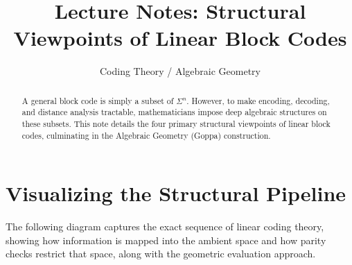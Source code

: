 \documentclass[11pt, a4paper]{article}
\title{\textbf{Lecture Notes: Structural Viewpoints of Linear Block Codes}}
\author{Coding Theory / Algebraic Geometry}
\date{}
\begin{document}
	
	\maketitle
	
	\begin{abstract}
		A general block code is simply a subset of $\Sigma^n$. However, to make encoding, decoding, and distance analysis tractable, mathematicians impose deep algebraic structures on these subsets. This note details the four primary structural viewpoints of linear block codes, culminating in the Algebraic Geometry (Goppa) construction.
	\end{abstract}
	
	\section{Visualizing the Structural Pipeline}
	
	The following diagram captures the exact sequence of linear coding theory, showing how information is mapped into the ambient space and how parity checks restrict that space, along with the geometric evaluation approach.
	
\end{document}
